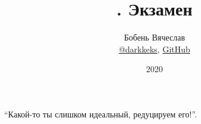 \documentclass[a4paper]{article}
\title{\HugeАлгебра. Экзамен}
\author{
	Бобень Вячеслав \\
	\href{https://teleg.run/darkkeks}{@darkkeks},
    \href{https://github.com/LoDThe/hse-tex}{GitHub}
}
\date{2020}
\begin{document}
    \maketitle

    \epigraph{
        ``Какой-то ты слишком идеальный, редуцируем его!''.
    }{}

    \tableofcontents

    \newpage

    
    
    
    
    
    
    
    
    
    
    
    
    
    
    
    
    
    
    
    
    
    
    
    
    
    
    
    
    
    
    
    
\end{document}
